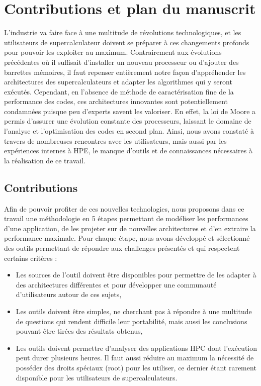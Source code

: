 \section{Contributions et plan du manuscrit}
    
    L'industrie va faire face à une multitude de révolutions technologiques, et les utilisateurs de supercalculateur doivent se préparer à ces changements profonds pour pouvoir les exploiter au maximum. Contrairement aux évolutions précédentes où il suffisait d'installer un nouveau processeur ou d'ajouter des barrettes mémoires, il faut repenser entièrement notre façon d'appréhender les architectures des supercalculateurs et adapter les algorithmes qui y seront exécutés. Cependant, en l'absence de méthode de caractérisation fine de la performance des codes, ces architectures innovantes sont potentiellement condamnées puisque peu d'experts savent les valoriser. En effet, la loi de Moore a permis d'assurer une évolution constante des processeurs, laissant le domaine de l'analyse et l'optimisation des codes en second plan. Ainsi, nous avons constaté à travers de nombreuses rencontres avec les utilisateurs, mais aussi par les expériences internes à HPE, le manque d'outils et de connaissances nécessaires à la réalisation de ce travail.
    
    \subsection{Contributions}
        
        Afin de pouvoir profiter de ces nouvelles technologies, nous proposons dans ce travail une méthodologie en 5 étapes permettant de modéliser les performances d'une application, de les projeter sur de nouvelles architectures et d'en extraire la performance maximale. Pour chaque étape, nous avons développé et sélectionné des outils permettant de répondre aux challenges présentés et qui respectent certains critères :
        \begin{itemize}
            \item Les sources de l'outil doivent être disponibles pour permettre de les adapter à des architectures différentes et pour développer une communauté d'utilisateurs autour de ces sujets,
            \item Les outils doivent être simples, ne cherchant pas à répondre à une multitude de questions qui rendent difficile leur portabilité, mais aussi les conclusions pouvant être tirées des résultats obtenus,
            \item Les outils doivent permettre d'analyser des applications HPC dont l'exécution peut durer plusieurs heures. Il faut aussi réduire au maximum la nécessité de posséder des droits spéciaux (root) pour les utiliser, ce dernier étant rarement disponible pour les utilisateurs de supercalculateurs.
        \end{itemize}
        
